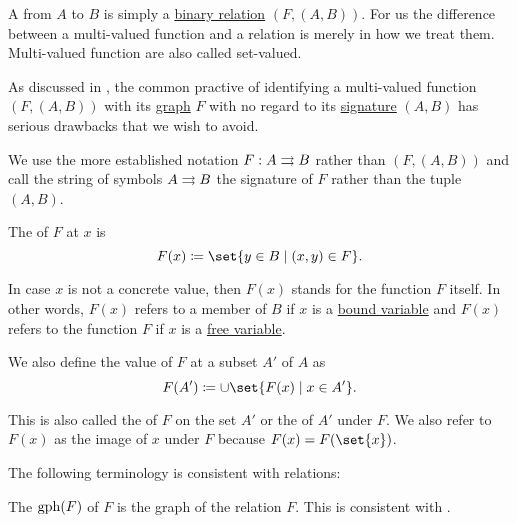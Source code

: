 \begin{definition}\label{def:multi_valued_function}
  A  from \( A \) to \( B \) is simply a \hyperref[def:binary_relation]{binary relation} \( (F, (A, B)) \). For us the difference between a multi-valued function and a relation is merely in how we treat them. Multi-valued function are also called set-valued.

  As discussed in , the common practive of identifying a multi-valued function \( (F, (A, B)) \) with its \hyperref[def:binary_relation/graph]{graph} \( F \) with no regard to its \hyperref[def:binary_relation/signature]{signature} \( (A, B) \) has serious drawbacks that we wish to avoid.

  We use the more established notation \( F: A \rightrightarrows B \) rather than \( (F, (A, B)) \) and call the string of symbols \( A \rightrightarrows B \) the signature of \( F \) rather than the tuple \( (A, B) \).

  \begin{thmenum}[series=def:multi_valued_function]
     The  of \( F \) at \( x \) is
    \begin{equation*}
      F(x) \coloneqq \set{ y \in B \given (x, y) \in F }.
    \end{equation*}

    In case \( x \) is not a concrete value, then \( F(x) \) stands for the function \( F \) itself. In other words, \( F(x) \) refers to a member of \( B \) if \( x \) is a \hyperref[def:first_order_syntax/formula_bound_variables]{bound variable} and \( F(x) \) refers to the function \( F \) if \( x \) is a \hyperref[def:first_order_syntax/formula_free_variables]{free variable}.

     We also define the value of \( F \) at a subset \( A' \) of \( A \) as
    \begin{equation*}
      F(A') \coloneqq \cup \set{ F(x) \given x \in A' }.
    \end{equation*}

    This is also called the  of \( F \) on the set \( A' \) or the  of \( A' \) under \( F \). We also refer to \( F(x) \) as the image of \( x \) under \( F \) because \( F(x) = F(\set{x}) \).
  \end{thmenum}

  The following terminology is consistent with relations:
  \begin{thmenum}[resume=def:multi_valued_function]
     The  \( \operatorname{gph}(F) \) of \( F \) is the graph of the relation \( F \). This is consistent with .


\end{thmenum}
\end{definition}
